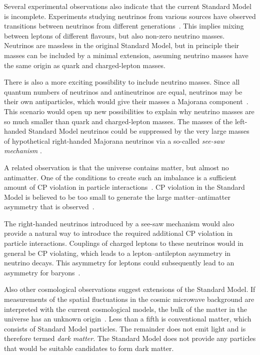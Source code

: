 Several experimental observations also indicate that the current Standard Model is incomplete. Experiments studying neutrinos from various
sources have observed transitions between neutrinos from different
generations~\cite{Fukuda:1998mi,*Ahmad:2002jz,*Eguchi:2002dm,*An:2012eh}. This implies mixing between leptons of different flavours, but
also non-zero neutrino masses. Neutrinos are massless in the original Standard Model, but in principle their masses can be included by a
minimal extension, assuming neutrino masses have the same origin as quark and charged-lepton masses.

There is also a more exciting possibility to include neutrino masses. Since all quantum numbers of neutrinos and antineutrinos are equal,
neutrinos may be their own antiparticles, which would give their masses a Majorana component~\cite{Majorana:1937vz}. This scenario would
open up new possibilities to explain why neutrino masses are so much smaller than quark and charged-lepton masses. The masses of the
left-handed Standard Model neutrinos could be suppressed by the very large masses of hypothetical right-handed Majorana neutrinos via a
so-called \emph{see-saw mechanism} \cite{Minkowski:1977sc}.

A related observation is that the universe contains matter, but almost no antimatter. One of the conditions to create such an imbalance is
a sufficient amount of CP violation in particle interactions~\cite{Sakharov:1967dj}. CP violation in the Standard Model is believed to be
too small to generate the large matter--antimatter asymmetry that is observed~\cite{Gavela:1993ts,*Huet:1994jb,*Gavela:1994dt}.

The right-handed neutrinos introduced by a see-saw mechanism would also provide a natural way to introduce the required additional CP
violation in particle interactions. Couplings of charged leptons to these neutrinos would in general be CP violating, which leads to a
lepton--antilepton asymmetry in neutrino decays. This asymmetry for leptons could subsequently lead to an asymmetry for
baryons~\cite{Kuzmin:1985mm,*Fukugita:1986hr}.

Also other cosmological observations suggest extensions of the Standard Model. If measurements of the spatial fluctuations in the cosmic
microwave background are interpreted with the current cosmological models, the bulk of the matter in the universe has an unknown
origin~\cite{Hinshaw:2012aka}. Less than a fifth is conventional matter, which consists of Standard Model particles. The remainder does not
emit light and is therefore termed \emph{dark matter}. The Standard Model does not provide any particles that would be suitable candidates
to form dark matter.

